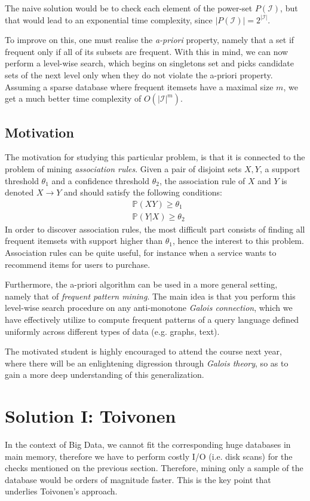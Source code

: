 \documentclass[11pt]{sigplanconf}
\renewcommand\it{\textit}
\newcommand\I{\mathcal{I}}
\renewcommand\P{\mathds{P}}
\begin{document}
The naive solution would be to check each element of the power-set $P(\I)$, but that would lead to an exponential time complexity, since $|P(\I)| = 2^{|\I|}$.

To improve on this, one must realise the \it{a-priori} property, namely that a set if frequent only if all of its subsets are frequent. With this in mind, we can now perform a level-wise search, which begins on singletons set and picks candidate sets of the next level only when they do not violate the a-priori property. Assuming a sparse database where frequent itemsets have a maximal size $m$, we get a much better time complexity of $O(|\I|^m)$.

\subsection{Motivation}
The motivation for studying this particular problem, is that it is connected to the problem of mining \it{association rules}. Given a pair of disjoint sets $X, Y$, a support threshold $\theta_1$ and a confidence threshold $\theta_2$, the association rule of $X$ and $Y$ is denoted $X \rightarrow Y$ and should satisfy the following conditions:
\begin{align*}
&\P(XY) \geq \theta_1 \\
&\P(Y|X) \geq \theta_2
\end{align*}
In order to discover association rules, the most difficult part consists of finding all frequent itemsets with support higher than $\theta_1$, hence the interest to this problem. Association rules can be quite useful, for instance when a service wants to recommend items for users to purchase.

Furthermore, the a-priori algorithm can be used in a more general setting, namely that of \it{frequent pattern mining}. The main idea is that you perform this level-wise search procedure on any anti-monotone \it{Galois connection}, which we have effectively utilize to compute frequent patterns of a query language defined uniformly across different types of data (e.g. graphs, text).

The motivated student is highly encouraged to attend the course next year, where there will be an enlightening digression through \textit{Galois theory}, so as to gain a more deep understanding of this generalization.

\section{Solution I: Toivonen}
In the context of Big Data, we cannot fit the corresponding huge databases in main memory, therefore we have to perform costly I/O (i.e. disk scans) for the checks mentioned on the previous section. Therefore, mining only a sample of the database would be orders of magnitude faster. This is the key point that underlies Toivonen's approach.
\end{document}
